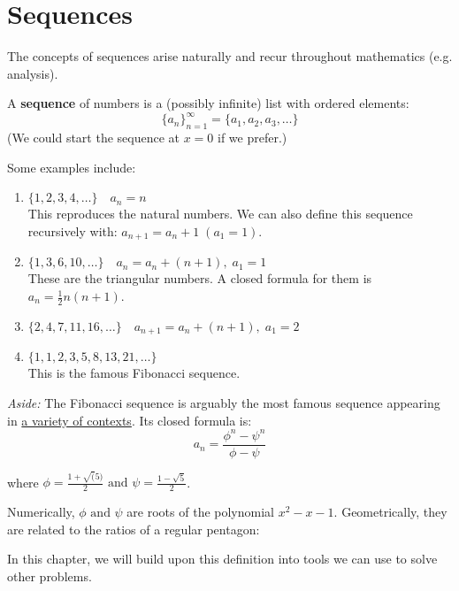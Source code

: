 \documentclass[../main.tex]{subfiles}
\begin{document}
\section{Sequences}

The concepts of sequences arise naturally and recur throughout mathematics (e.g. analysis).

\begin{definition}[Sequences]
    A \textbf{sequence} of numbers is a (possibly infinite) list with ordered elements:
    \[ \displaystyle \{a_n\}^{\infty}_{n=1} = \{a_1, a_2, a_3, \dots \}\]
    (We could start the sequence at \( x=0 \) if we prefer.)
\end{definition}

Some examples include:
\begin{enumerate}
    \item \( \{1, 2, 3, 4, \dots \} \quad a_n = n \) \\
        This reproduces the natural numbers.
        We can also define this sequence recursively with: \( a_{n+1} = a_n +1 \; (a_1 = 1) \).
    \item \( \{1, 3, 6, 10, \dots \} \quad a_n = a_n + (n+1), \; a_1 =1  \) \\
        These are the triangular numbers. A closed formula for them is \( a_n = \frac{1}{2}n(n+1) \).
    \item \( \{2, 4, 7, 11, 16, \dots \} \quad a_{n+1} = a_n +(n+1), \; a_1 = 2 \)
    \item \( \{1,1,2,3,5,8,13,21, \dots \} \) \\
        This is the famous Fibonacci sequence.
\end{enumerate}

\textit{Aside:} The Fibonacci sequence is arguably the most famous sequence appearing in \href{https://www.fq.math.ca/}{a variety of contexts}.
Its closed formula is: \[ a_n = \frac{\phi^n - \psi^n}{\phi-\psi} \]

where \( \displaystyle \phi = \frac{1+\sqrt(5)}{2} \text{ and } \psi = \frac{1-\sqrt{5}}{2} \).

Numerically, \( \phi \text{ and } \psi \) are roots of the polynomial \( x^2 - x - 1 \).
Geometrically, they are related to the ratios of a regular pentagon:


In this chapter, we will build upon this definition into tools we can use to solve other problems.

\end{document}
